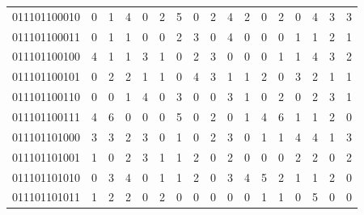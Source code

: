 \documentclass[10pt,a4paper]{article}
\begin{document}
\begin{longtable}{ |c|c|c|c|c|c|c|c|c|c|c|c|c|c|c|c|c| }
    011101100010              & 0                            & 1                                & 4                            & 0                              & 2   & 5   & 0   & 2   & 4   & 2   & 0   & 2   & 0   & 4   & 3   & 3   \\
    011101100011              & 0                            & 1                                & 1                            & 0                              & 0   & 2   & 3   & 0   & 4   & 0   & 0   & 0   & 1   & 1   & 2   & 1   \\
    011101100100              & 4                            & 1                                & 1                            & 3                              & 1   & 0   & 2   & 3   & 0   & 0   & 0   & 1   & 1   & 4   & 3   & 2   \\
    011101100101              & 0                            & 2                                & 2                            & 1                              & 1   & 0   & 4   & 3   & 1   & 1   & 2   & 0   & 3   & 2   & 1   & 1   \\
    011101100110              & 0                            & 0                                & 1                            & 4                              & 0   & 3   & 0   & 0   & 3   & 1   & 0   & 2   & 0   & 2   & 3   & 1   \\
    011101100111              & 4                            & 6                                & 0                            & 0                              & 0   & 5   & 0   & 2   & 0   & 1   & 4   & 6   & 1   & 1   & 2   & 0   \\
    011101101000              & 3                            & 3                                & 2                            & 3                              & 0   & 1   & 0   & 2   & 3   & 0   & 1   & 1   & 4   & 4   & 1   & 3   \\
    011101101001              & 1                            & 0                                & 2                            & 3                              & 1   & 1   & 2   & 0   & 2   & 0   & 0   & 0   & 2   & 2   & 0   & 2   \\
    011101101010              & 0                            & 3                                & 4                            & 0                              & 1   & 1   & 2   & 0   & 3   & 4   & 5   & 2   & 1   & 1   & 2   & 0   \\
    011101101011              & 1                            & 2                                & 2                            & 0                              & 2   & 0   & 0   & 0   & 0   & 0   & 1   & 1   & 0   & 5   & 0   & 0   \\

\end{longtable}
\end{document}
